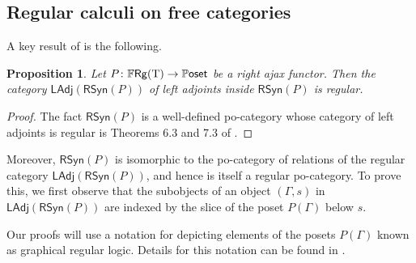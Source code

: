 \documentclass[11pt, oneside, article]{memoir}
\theoremstyle{plain}
\newtheorem{proposition}[theorem]{Proposition}
\newtheorem{corollary}[theorem]{Corollary}
\theoremstyle{definition}
\theoremstyle{remark}
\newcommand{\Set}[1]{\mathrm{#1}}%
\newcommand{\Cat}[1]{{\mathsf{#1}}}%
\newcommand{\CCat}[1]{\mathbb{\StrLeft{#1}{1}}\Cat{\StrGobbleLeft{#1}{1}}}%
\newcommand{\Funr}[1]{\mathsf{#1}}%
\newcommand{\rsyn}{\Funr{RSyn}}
\newcommand{\abc}{P} %
\newcommand{\types}{\Set{T}}
\newcommand{\pposet}{\CCat{Poset}}
\newcommand{\frg}[1][\types]{
  \ifthenelse{\equal{#1}{blank}}{\Cat{FRg}}{\Cat{FRg}(#1)}
}
\newcommand{\ffrg}[1][\types]{
  \ifthenelse{\equal{#1}{blank}}{\CCat{FRg}}{\CCat{FRg}(#1)}
}
\newcommand{\ladj}{\Cat{LAdj}}%
\begin{document}
%
%
%
%
%

\subsection{Regular calculi on free categories}
A key result of \cite{fong2018graphical} is the following.

\begin{proposition}
Let $\abc\colon\ffrg\to\pposet$ be a right ajax functor. Then the category $\ladj(\rsyn(\abc))$ of left adjoints inside $\rsyn(\abc)$ is regular. 
\end{proposition}
\begin{proof}
	The fact $\rsyn(\abc)$ is a well-defined po-category whose category of left adjoints is regular is Theorems 6.3 and 7.3 of \cite{fong2018graphical}.
\end{proof}


Moreover, $\rsyn(\abc)$ is isomorphic to the po-category of relations of the regular category $\ladj(\rsyn(\abc))$, and hence is itself a regular po-category. To prove this, we first observe that the subobjects of an object $(\Gamma,s)$ in $\ladj(\rsyn(\abc))$ are indexed by the slice of the poset $\abc(\Gamma)$ below $s$.

Our proofs will use a notation for depicting elements of the posets $\abc(\Gamma)$ known as graphical regular logic. Details for this notation can be found in \cite{fong2018graphical}.
\end{document}
